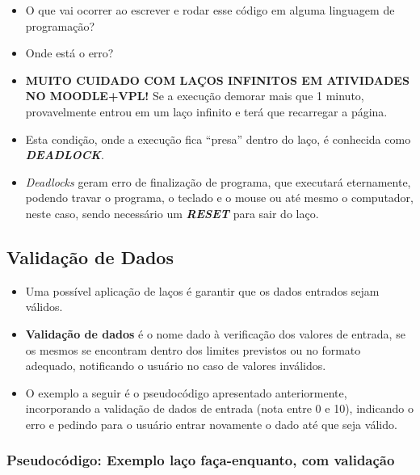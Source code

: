 \documentclass[12pt,a4paper]{article}
\providecommand{\tightlist}{%
      \setlength{\itemsep}{0pt}\setlength{\parskip}{0pt}}
\begin{document}
    \begin{itemize}
\tightlist
\item
  O que vai ocorrer ao escrever e rodar esse código em alguma linguagem
  de programação?
\item
  Onde está o erro?
\item
  \textbf{MUITO CUIDADO COM LAÇOS INFINITOS EM ATIVIDADES NO
  MOODLE+VPL!} Se a execução demorar mais que 1 minuto, provavelmente
  entrou em um laço infinito e terá que recarregar a página.
\item
  Esta condição, onde a execução fica ``presa'' dentro do laço, é
  conhecida como \textbf{\emph{DEADLOCK}}.
\item
  \emph{Deadlocks} geram erro de finalização de programa, que executará
  eternamente, podendo travar o programa, o teclado e o mouse ou até
  mesmo o computador, neste caso, sendo necessário um
  \textbf{\emph{RESET}} para sair do laço.
\end{itemize}

    \hypertarget{validauxe7uxe3o-de-dados}{%
\subsection{Validação de Dados}\label{validauxe7uxe3o-de-dados}}

    \begin{itemize}
\item
  Uma possível aplicação de laços é garantir que os dados entrados sejam
  válidos.
\item
  \textbf{Validação de dados} é o nome dado à verificação dos valores de
  entrada, se os mesmos se encontram dentro dos limites previstos ou no
  formato adequado, notificando o usuário no caso de valores inválidos.
\item
  O exemplo a seguir é o pseudocódigo apresentado anteriormente,
  incorporando a validação de dados de entrada (nota entre 0 e 10),
  indicando o erro e pedindo para o usuário entrar novamente o dado até
  que seja válido.
\end{itemize}

    \hypertarget{pseudocuxf3digo-exemplo-lauxe7o-fauxe7a-enquanto-com-validauxe7uxe3o}{%
\subsubsection{Pseudocódigo: Exemplo laço faça-enquanto, com
validação}\label{pseudocuxf3digo-exemplo-lauxe7o-fauxe7a-enquanto-com-validauxe7uxe3o}}
\end{document}
